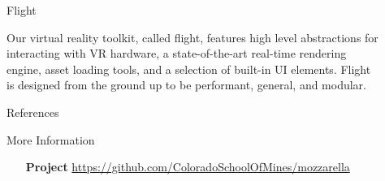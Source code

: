 \documentclass[final]{beamer}
\newlength{\sepwid}
\newlength{\onecolwid}
\begin{document}
\begin{frame}[t]
\begin{columns}[t]
            \begin{column}{\sepwid}\end{column} %

            \begin{column}{\onecolwid} %

                \begin{block}{Flight}
                    \setlength{\parskip}{0.5em}

                    Our virtual reality toolkit, called flight, features high
                    level abstractions for interacting with VR hardware, a
                    state-of-the-art real-time rendering engine, asset loading
                    tools, and a selection of built-in UI elements. Flight is
                    designed from the ground up to be performant, general, and
                    modular.

                \end{block}

                \begin{block}{References}
                    \printbibliography
                \end{block}


                \begin{alertblock}{More Information}

                    \begin{enumerate}[leftmargin=6.5cm, labelsep=1cm]

                        \item[\textbf{Project}]
                            \href{https://github.com/ColoradoSchoolOfMines/mozzarella}{\url{https://github.com/ColoradoSchoolOfMines/mozzarella}}

                    \end{enumerate}

                \end{alertblock}
            \end{column} %

            \begin{column}{\sepwid}\end{column} %


\end{columns}
\end{frame}
\end{document}
